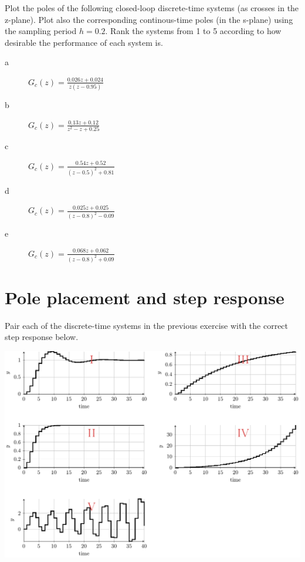 \documentclass[letterpaper,fleqn]{scrartcl}
\begin{document}
Plot the poles of the following closed-loop discrete-time systems (as crosses in the z-plane). Plot also the corresponding continous-time poles (in the s-plane) using the sampling period \(h=0.2\). Rank the systems from 1 to 5 according to how desirable the performance of each system is.
\begin{description}
\item[{a}] \( G_c(z) = \frac{0.026z + 0.024}{z(z-0.95)}\)
\item[{b}] \( G_c(z) = \frac{0.13z + 0.12}{z^2 - z + 0.25} \)
\item[{c}] \(G_c(z) = \frac{0.54z + 0.52}{(z-0.5)^2 + 0.81}\)
\item[{d}] \(G_c(z) = \frac{0.025z + 0.025}{(z-0.8)^2 - 0.09}\)
\item[{e}] \(G_c(z) = \frac{0.068z + 0.062}{(z-0.8)^2 + 0.09}\)
\end{description}

\newpage 
\section*{Pole placement and step response}
\label{sec-2}
Pair each of the discrete-time systems in the previous exercise with the correct step response below.
\begin{center}
\includegraphics[width=\linewidth]{closed-loop-step-responsen}
\end{center}
\end{document}
